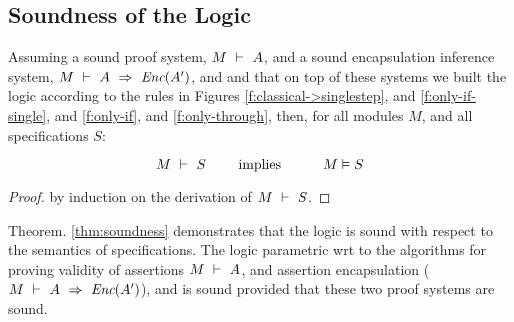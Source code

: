 \subsection{Soundness of the \Nec Logic}

\label{s:soundness}

\begin{theorem}[Soundness]
\label{thm:soundness}
Assuming a sound \SpecO proof system, $M\ \vdash\ A$, and
a sound encapsulation inference system, $M\ \vdash\ A\ \Rightarrow\ \textit{Enc}(A')$,
 and  and that on top of these systems we built
 the \Nec logic according to the rules in Figures \ref{f:classical->singlestep},  and \ref{f:only-if-single}, and \ref{f:only-if},  and \ref{f:only-through},   then, for    all modules $M$, and all \Nec specifications  $S$:
 
 $$\proves{M}{S}\ \ \ \ \ \ \ \mbox{implies}\ \ \ \ \ \  \ \ \ \satisfies{M}{S}$$
\end{theorem}

\begin{proof}
by induction on the derivation of $M\ \vdash\ S$.
\end{proof}

Theorem. \ref{thm:soundness} demonstrates 
 that the   \Nec logic is sound with respect to the semantics of \Nec specifications.
 The \Nec logic parametric wrt to the algorithms for proving validity of assertions
 $M\ \vdash\ A$, and 
 assertion encapsulation ($M\ \vdash\ A\ \Rightarrow\ \textit{Enc}(A')$), and is sound
 provided that these two proof systems are sound.



